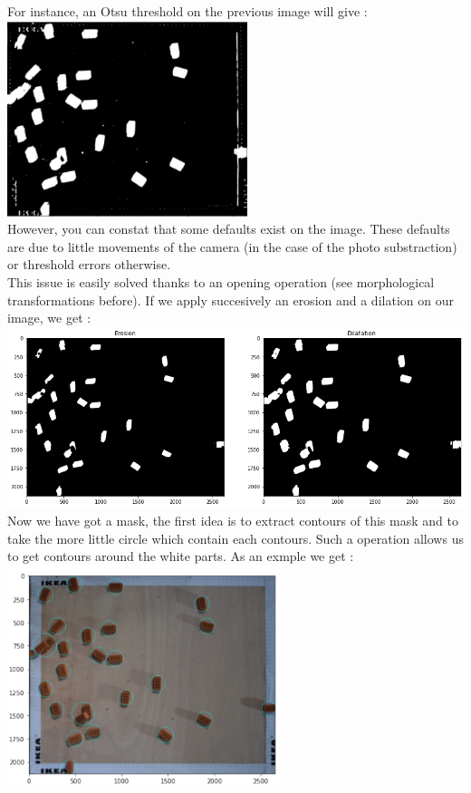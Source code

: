 \documentclass{article}
\begin{document}
For instance, an Otsu threshold on the previous image will give :\\
\includegraphics[width=7cm]{images/img24.png}\\

However, you can constat that some defaults exist on the image. These defaults are due to little movements of the camera (in the case of the photo substraction) or threshold errors otherwise.\\

This issue is easily solved thanks to an opening operation (see morphological transformations before).
If we apply succesively an erosion and a dilation on our image, we get :\\
\includegraphics[width=14cm]{images/img25.png}\\ 

Now we have got a mask, the first idea is to extract contours of this mask and to take the more little circle which contain each contours. Such a operation allows us to get contours around the white parts. As an exmple we get :\\
\includegraphics[width=8cm]{images/img26.png}\\
\end{document}
